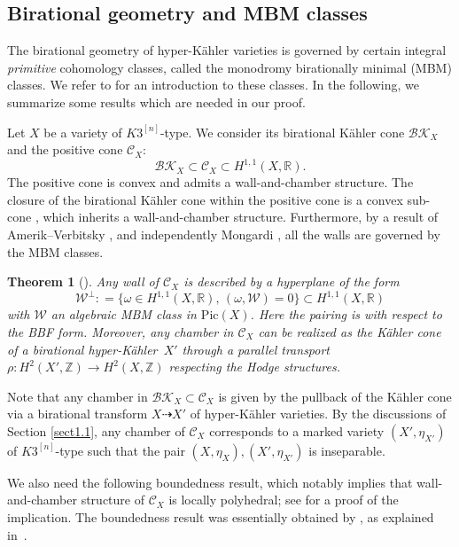 \documentclass[11pt]{amsart}
\theoremstyle{plain}
\newtheorem{thm}{Theorem}[section]
\theoremstyle{definition}
\theoremstyle{remark}
\newcommand{\BR}{{\mathbb{R}}}
\newcommand{\BZ}{{\mathbb{Z}}}
\newcommand{\CW}{{\mathcal W}}
\begin{document}
\subsection{Birational geometry and MBM classes}
The birational geometry of hyper-K\"ahler varieties is governed by certain integral \emph{primitive} cohomology classes, called the monodromy birationally minimal (MBM) classes. We refer to \cite{AVsurvey} for an introduction to these classes. In the following, we summarize some results which are needed in our proof.

Let $X$ be a variety of $K3^{[n]}$-type. We consider its birational K\"ahler cone $\mathcal{BK}_X$ and the positive cone $\mathcal{C}_X$:
\[
\mathcal{BK}_X \subset \mathcal{C}_X  \subset H^{1,1}(X, \BR).
\]
The positive cone is convex and admits a wall-and-chamber structure. The closure of the birational K\"ahler cone within the positive cone is a convex sub-cone \cite{H_cone}, which inherits a wall-and-chamber structure. Furthermore, by a result of Amerik--Verbitsky \cite{AV}, and independently Mongardi \cite{Mon}, all the walls are governed by the MBM classes.

\begin{thm}[\cite{Mon, AV}]\label{thm1.5}
    Any wall of $\mathcal{C}_X$ is described by a hyperplane of the form 
    \[
    \CW^{\perp}: = \{\omega \in H^{1,1}(X,\BR), \, (\omega, \CW) = 0\}\subset H^{1,1}(X, \BR)
    \]
    with $\CW$ an algebraic MBM class in $\mathrm{Pic}(X)$. Here the pairing is with respect to the BBF form. Moreover, any chamber in $\mathcal{C}_X$ can be realized as the K\"ahler cone of a birational hyper-K\"ahler~$X'$ through a parallel transport $\rho: H^2(X', \BZ) \to H^2(X, \BZ)$ respecting the Hodge structures.
\end{thm}

Note that any chamber in $\mathcal{BK}_X \subset \mathcal{C}_X$ is given by the pullback of the K\"ahler cone via a birational transform $X \dashrightarrow X'$ of hyper-K\"ahler varieties. By the discussions of Section \ref{sect1.1}, any chamber of $\mathcal{C}_X$ corresponds to a marked variety $(X' ,\eta_{X'})$ of $K3^{[n]}$-type such that the pair $(X, \eta_X), (X', \eta_{X'})$ is inseparable.

We also need the following boundedness result, which notably implies that wall-and-chamber structure of $\mathcal{C}_X$ is locally polyhedral; see \cite[Remark~8.2.3]{HK3} for a proof of the implication. The boundedness result was essentially obtained by \cite{BHT}, as explained in~\cite[Section 6.2]{AV}.
\end{document}

